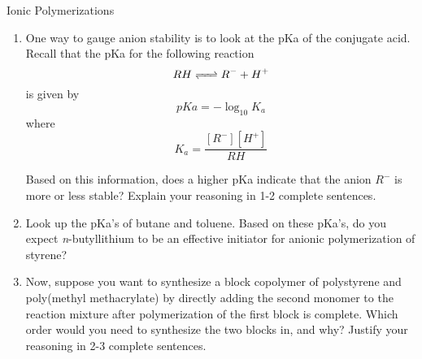 \begin{activity}{Ionic Polymerizations}
\begin{exercises}
\begin{enumerate}
			\item One way to gauge anion stability is to look at the pKa of the conjugate acid.  Recall that the pKa for the following reaction
					\begin{equation*}
						RH \ce{<=>} R^- + H^+
					\end{equation*}
				is given by 
					\begin{equation*}
						pKa = -\log_{10} K_a
					\end{equation*}
				where
					\begin{equation*}
						K_a = \frac{[R^-][H^+]}{RH}
					\end{equation*}
					
					Based on this information, does a higher pKa indicate that the anion $R^-$ is more or less stable?  Explain your reasoning in 1-2 complete sentences.
					
				\begin{solution}\end{solution}
				
			\item Look up the pKa's of butane and toluene.  Based on these pKa's, do you expect \emph{n}-butyllithium to be an effective initiator for anionic polymerization of styrene?
			
				\begin{solution}\end{solution}
				
			
			\item Now, suppose you want to synthesize a block copolymer of polystyrene and poly(methyl methacrylate) by directly adding the second monomer to the reaction mixture after polymerization of the first block is complete.  Which order would you need to synthesize the two blocks in, and why?  Justify your reasoning in 2-3 complete sentences.
			

\end{enumerate}
\end{exercises}
\end{activity}
